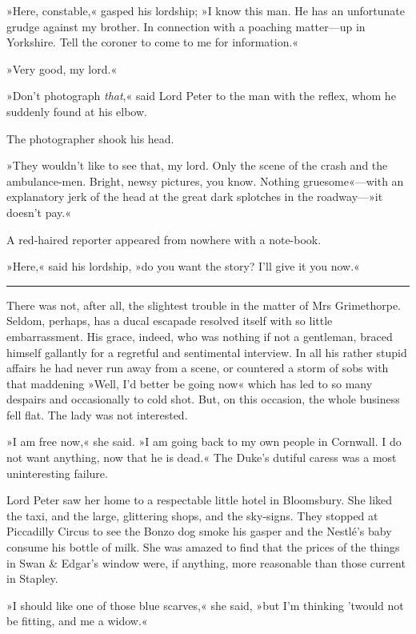 »Here, constable,« gasped his lordship; »I know this man. He has an unfortunate grudge against my brother. In connection with a poaching matter\allowbreak---\allowbreak up in Yorkshire. Tell the coroner to come to me for information.«

»Very good, my lord.«

»Don't photograph \textit{that},« said Lord Peter to the man with the reflex, whom he suddenly found at his elbow.

The photographer shook his head.

»They wouldn't like to see that, my lord. Only the scene of the crash and the ambulance-men. Bright, newsy pictures, you know. Nothing gruesome«---with an explanatory jerk of the head at the great dark splotches in the roadway---»it doesn't pay.«

A red-haired reporter appeared from nowhere with a note-book.

»Here,« said his lordship, »do you want the story? I'll give it you now.« 

\noindent\hfil\rule{0.5\textwidth}{.4pt}\hfil 

There was not, after all, the slightest trouble in the matter of Mrs  Grimethorpe. Seldom, perhaps, has a ducal escapade resolved itself with so little embarrassment. His grace, indeed, who was nothing if not a gentleman, braced himself gallantly for a regretful and sentimental interview. In all his rather stupid affairs he had never run away from a scene, or countered a storm of sobs with that maddening »Well, I'd better be going now« which has led to so many despairs and occasionally to cold shot. But, on this occasion, the whole business fell flat. The lady was not interested.

»I am free now,« she said. »I am going back to my own people in Cornwall. I do not want anything, now that he is dead.« The Duke's dutiful caress was a most uninteresting failure.

Lord Peter saw her home to a respectable little hotel in Bloomsbury.  She liked the taxi, and the large, glittering shops, and the sky-signs.  They stopped at Piccadilly Circus to see the Bonzo dog smoke his gasper and the Nestlé's baby consume his bottle of milk. She was amazed to find that the prices of the things in Swan \& Edgar's window were, if anything, more reasonable than those current in Stapley.

»I should like one of those blue scarves,« she said, »but I'm thinking 'twould not be fitting, and me a widow.«

